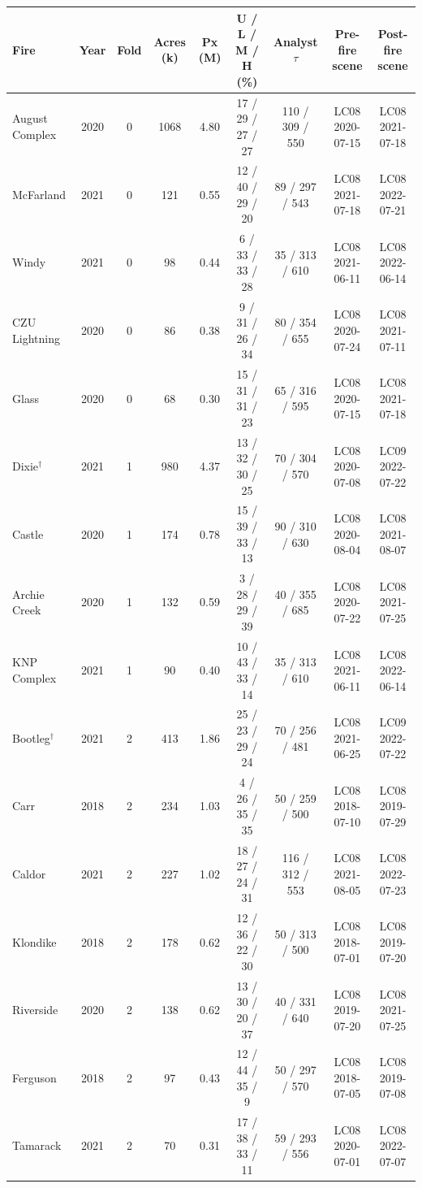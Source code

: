 \begin{table}[H]
\centering
\scriptsize
\setlength{\tabcolsep}{3pt}
\begin{tabular}{lcccccccc}
\toprule
Fire & Year & Fold & Acres (k) & Px (M) & U / L / M / H (\%) & Analyst $\tau$ & Pre-fire scene & Post-fire scene \\
\midrule
August Complex & 2020 & 0 & 1068 & 4.80 & 17 / 29 / 27 / 27 & 110 / 309 / 550 & LC08 2020-07-15 & LC08 2021-07-18 \\
McFarland & 2021 & 0 & 121 & 0.55 & 12 / 40 / 29 / 20 & 89 / 297 / 543 & LC08 2021-07-18 & LC08 2022-07-21 \\
Windy & 2021 & 0 & 98 & 0.44 & 6 / 33 / 33 / 28 & 35 / 313 / 610 & LC08 2021-06-11 & LC08 2022-06-14 \\
CZU Lightning & 2020 & 0 & 86 & 0.38 & 9 / 31 / 26 / 34 & 80 / 354 / 655 & LC08 2020-07-24 & LC08 2021-07-11 \\
Glass & 2020 & 0 & 68 & 0.30 & 15 / 31 / 31 / 23 & 65 / 316 / 595 & LC08 2020-07-15 & LC08 2021-07-18 \\
Dixie$^\dagger$ & 2021 & 1 & 980 & 4.37 & 13 / 32 / 30 / 25 & 70 / 304 / 570 & LC08 2020-07-08 & LC09 2022-07-22 \\
Castle & 2020 & 1 & 174 & 0.78 & 15 / 39 / 33 / 13 & 90 / 310 / 630 & LC08 2020-08-04 & LC08 2021-08-07 \\
Archie Creek & 2020 & 1 & 132 & 0.59 & 3 / 28 / 29 / 39 & 40 / 355 / 685 & LC08 2020-07-22 & LC08 2021-07-25 \\
KNP Complex & 2021 & 1 & 90 & 0.40 & 10 / 43 / 33 / 14 & 35 / 313 / 610 & LC08 2021-06-11 & LC08 2022-06-14 \\
Bootleg$^\dagger$ & 2021 & 2 & 413 & 1.86 & 25 / 23 / 29 / 24 & 70 / 256 / 481 & LC08 2021-06-25 & LC09 2022-07-22 \\
Carr & 2018 & 2 & 234 & 1.03 & 4 / 26 / 35 / 35 & 50 / 259 / 500 & LC08 2018-07-10 & LC08 2019-07-29 \\
Caldor & 2021 & 2 & 227 & 1.02 & 18 / 27 / 24 / 31 & 116 / 312 / 553 & LC08 2021-08-05 & LC08 2022-07-23 \\
Klondike & 2018 & 2 & 178 & 0.62 & 12 / 36 / 22 / 30 & 50 / 313 / 500 & LC08 2018-07-01 & LC08 2019-07-20 \\
Riverside & 2020 & 2 & 138 & 0.62 & 13 / 30 / 20 / 37 & 40 / 331 / 640 & LC08 2019-07-20 & LC08 2021-07-25 \\
Ferguson & 2018 & 2 & 97 & 0.43 & 12 / 44 / 35 / 9 & 50 / 297 / 570 & LC08 2018-07-05 & LC08 2019-07-08 \\
Tamarack & 2021 & 2 & 70 & 0.31 & 17 / 38 / 33 / 11 & 59 / 293 / 556 & LC08 2020-07-01 & LC08 2022-07-07 \\

\end{tabular}
\end{table}
